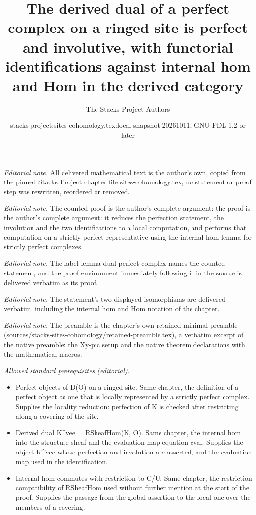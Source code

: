 \documentclass[10pt,a4paper]{amsart}
\title{The derived dual of a perfect complex on a ringed site is perfect and involutive, with functorial identifications against internal hom and Hom in the derived category}
\author{The Stacks Project Authors}
\date{stacks-project:sites-cohomology.tex:local-snapshot-20261011; GNU FDL 1.2 or later}
\theoremstyle{plain}
\theoremstyle{definition}
\theoremstyle{remark}
\numberwithin{equation}{subsection}
\begin{document}
\maketitle
\noindent\textit{Editorial note.} All delivered mathematical text is the author's own, copied from the pinned Stacks Project chapter file sites-cohomology.tex; no statement or proof step was rewritten, reordered or removed.\par\medskip
\noindent\textit{Editorial note.} The counted proof is the author's complete argument: the proof is the author's complete argument: it reduces the perfection statement, the involution and the two identifications to a local computation, and performs that computation on a strictly perfect representative using the internal-hom lemma for strictly perfect complexes.\par\medskip
\noindent\textit{Editorial note.} The label lemma-dual-perfect-complex names the counted statement, and the proof environment immediately following it in the source is delivered verbatim as its proof.\par\medskip
\noindent\textit{Editorial note.} The statement's two displayed isomorphisms are delivered verbatim, including the internal hom and Hom notation of the chapter.\par\medskip
\noindent\textit{Editorial note.} The preamble is the chapter's own retained minimal preamble (sources/stacks-sites-cohomology/retained-preamble.tex), a verbatim excerpt of the native preamble: the Xy-pic setup and the native theorem declarations with the mathematical macros.\par\medskip
\noindent\textit{Allowed standard prerequisites (editorial).}\begin{itemize}
\item Perfect objects of D(O) on a ringed site. Same chapter, the definition of a perfect object as one that is locally represented by a strictly perfect complex. Supplies the locality reduction: perfection of K is checked after restricting along a covering of the site.
\item Derived dual K\textasciicircum{}vee = RSheafHom(K, O). Same chapter, the internal hom into the structure sheaf and the evaluation map equation-eval. Supplies the object K\textasciicircum{}vee whose perfection and involution are asserted, and the evaluation map used in the identification.
\item Internal hom commutes with restriction to C/U. Same chapter, the restriction compatibility of RSheafHom used without further mention at the start of the proof. Supplies the passage from the global assertion to the local one over the members of a covering.
\end{itemize}\medskip
\end{document}
